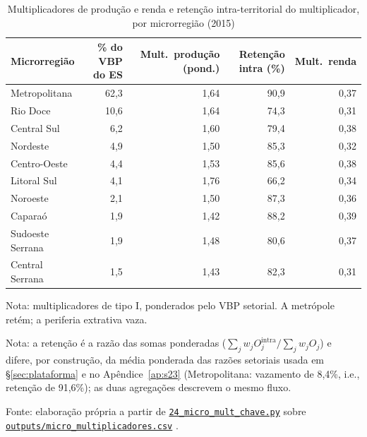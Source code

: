 \documentclass[11pt,a4paper]{article}
\begin{document}
\begin{table}[tbp]
\caption{Multiplicadores de produção e renda e retenção intra-territorial do multiplicador,
por microrregião (2015)}
\label{tab:micro}
\centering\small
\begin{threeparttable}
\begin{tabular}{lrrrr}
\toprule
Microrregião & \% do VBP do ES & Mult.\ produção (pond.) & Retenção intra (\%) & Mult.\ renda \\
\midrule
Metropolitana & 62,3 & 1,64 & 90,9 & 0,37 \\
Rio Doce & 10,6 & 1,64 & 74,3 & 0,31 \\
Central Sul & 6,2 & 1,60 & 79,4 & 0,38 \\
Nordeste & 4,9 & 1,50 & 85,3 & 0,32 \\
Centro-Oeste & 4,4 & 1,53 & 85,6 & 0,38 \\
Litoral Sul & 4,1 & 1,76 & 66,2 & 0,34 \\
Noroeste & 2,1 & 1,50 & 87,3 & 0,36 \\
Caparaó & 1,9 & 1,42 & 88,2 & 0,39 \\
Sudoeste Serrana & 1,9 & 1,48 & 80,6 & 0,37 \\
Central Serrana & 1,5 & 1,43 & 82,3 & 0,31 \\
\bottomrule
\end{tabular}
\begin{tablenotes}[flushleft]\footnotesize
\item Nota: multiplicadores de tipo I, ponderados pelo VBP setorial. A metrópole retém; a
periferia extrativa vaza.
\item Nota: a retenção é a razão das somas ponderadas
($\sum_j w_j O^{\mathrm{intra}}_j / \sum_j w_j O_j$) e difere, por construção, da média
ponderada das razões setoriais usada em \S\ref{sec:plataforma} e no Apêndice~\ref{ap:s23}
(Metropolitana: vazamento de 8,4\%, i.e., retenção de 91,6\%); as duas agregações descrevem o
mesmo fluxo.
\item Fonte: elaboração própria a partir de
\href{https://github.com/fcarva/es-insumo-produto/blob/116a350/pesquisa/24_micro_mult_chave.py}{\texttt{24\_micro\_mult\_chave.py}}
sobre
\href{https://github.com/fcarva/es-insumo-produto/blob/116a350/pesquisa/outputs/micro_multiplicadores.csv}{\texttt{outputs/micro\_multiplicadores.csv}}
\citep{carvalho2026repo}.
\end{tablenotes}
\end{threeparttable}
\end{table}
\end{document}

